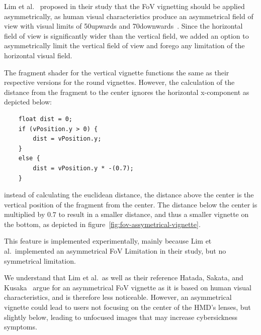 Lim et al.~\cite{Lim2020} proposed in their study that the FoV vignetting should be applied asymmetrically, as human
visual characteristics produce an asymmetrical field of view with visual limits of 50\textdegree upwards and
70\textdegree downwards~\cite{Hatada1980}.
Since the horizontal field of view is significantly wider than the vertical field, we added an option to asymmetrically
limit the vertical field of view and forego any limitation of the horizontal visual field.

The fragment shader for the vertical vignette functions the same as their respective versions for the round
vignettes.
However, the calculation of the distance from the fragment to the center ignores the horizontal x-component as depicted
below:
\begin{verbatim}
    float dist = 0;
    if (vPosition.y > 0) {
        dist = vPosition.y;
    }
    else {
        dist = vPosition.y * -(0.7);
    }
\end{verbatim}
instead of calculating the euclidean distance, the distance above the center is the vertical position of the fragment
from the center.
The distance below the center is multiplied by $0.7$ to result in a smaller distance, and thus a smaller vignette on
the bottom, as depicted in figure~\ref{fig:fov-assymetrical-vignette}.

This feature is implemented experimentally, mainly because Lim et al.\ implemented an asymmetrical FoV Limitation in
their study, but no symmetrical limitation.

We understand that Lim et al.\ as well as their reference Hatada, Sakata, and Kusaka~\cite{Hatada1980} argue for an
asymmetrical FoV vignette as it is based on human visual characteristics, and is therefore less noticeable.
However, an asymmetrical vignette could lead to users not focusing on the center of the HMD's lenses, but slightly
below, leading to unfocused images that may increase cybersickness symptoms.
